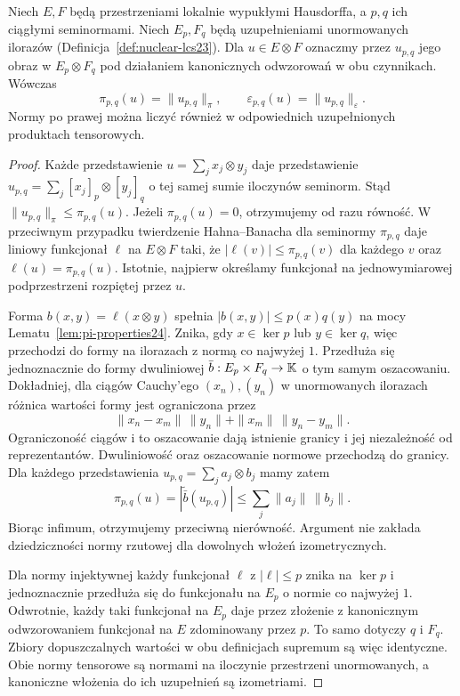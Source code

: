 \begin{lemat}
\label{lem:tensor-seminorm-completions24}
Niech $E,F$ będą przestrzeniami lokalnie wypukłymi
Hausdorffa, a $p,q$ ich ciągłymi seminormami.
Niech $E_p,F_q$ będą uzupełnieniami unormowanych
ilorazów (Definicja~\ref{def:nuclear-lcs23}).
Dla $u\in E\otimes F$ oznaczmy przez $u_{p,q}$
jego obraz w $E_p\otimes F_q$ pod działaniem
kanonicznych odwzorowań w obu czynnikach. Wówczas
\[
 \pi_{p,q}(u)=\|u_{p,q}\|_\pi,\qquad
 \varepsilon_{p,q}(u)=\|u_{p,q}\|_\varepsilon.
\]
Normy po prawej można liczyć również w odpowiednich
uzupełnionych produktach tensorowych.
\end{lemat}
\begin{proof}
Każde przedstawienie $u=\sum_jx_j\otimes y_j$
daje przedstawienie $u_{p,q}=\sum_j[x_j]_p\otimes[y_j]_q$
o tej samej sumie iloczynów seminorm. Stąd
$\|u_{p,q}\|_\pi\le\pi_{p,q}(u)$.
Jeżeli $\pi_{p,q}(u)=0$, otrzymujemy od razu równość.
W przeciwnym przypadku twierdzenie Hahna--Banacha
dla seminormy $\pi_{p,q}$ daje liniowy funkcjonał
$\ell$ na $E\otimes F$ taki, że
$|\ell(v)|\le\pi_{p,q}(v)$ dla każdego $v$
oraz $\ell(u)=\pi_{p,q}(u)$.
Istotnie, najpierw określamy funkcjonał na
jednowymiarowej podprzestrzeni rozpiętej przez $u$.

Forma $b(x,y)=\ell(x\otimes y)$ spełnia
$|b(x,y)|\le p(x)q(y)$ na mocy
Lematu~\ref{lem:pi-properties24}. Znika, gdy
$x\in\ker p$ lub $y\in\ker q$, więc przechodzi
do formy na ilorazach z normą co najwyżej $1$.
Przedłuża się jednoznacznie do formy dwuliniowej
$\bar b:E_p\times F_q\to\mathbb K$ o tym samym oszacowaniu.
Dokładniej, dla ciągów Cauchy'ego $(x_n),(y_n)$
w unormowanych ilorazach różnica wartości formy
jest ograniczona przez
\[
 \|x_n-x_m\|\,\|y_n\|+\|x_m\|\,\|y_n-y_m\|.
\]
Ograniczoność ciągów i to oszacowanie dają istnienie
granicy i jej niezależność od reprezentantów.
Dwuliniowość oraz oszacowanie normowe przechodzą
do granicy. Dla każdego przedstawienia
$u_{p,q}=\sum_j a_j\otimes b_j$ mamy zatem
\[
 \pi_{p,q}(u)=|\widetilde{\bar b}(u_{p,q})|
 \le\sum_j\|a_j\|\,\|b_j\|.
\]
Biorąc infimum, otrzymujemy przeciwną nierówność.
Argument nie zakłada dziedziczności normy rzutowej
dla dowolnych włożeń izometrycznych.

Dla normy injektywnej każdy funkcjonał $\ell$
z $|\ell|\le p$ znika na $\ker p$ i jednoznacznie
przedłuża się do funkcjonału na $E_p$ o normie
co najwyżej $1$. Odwrotnie, każdy taki funkcjonał
na $E_p$ daje przez złożenie z kanonicznym
odwzorowaniem funkcjonał na $E$ zdominowany przez $p$.
To samo dotyczy $q$ i $F_q$. Zbiory dopuszczalnych
wartości w obu definicjach supremum są więc identyczne.
Obie normy tensorowe są normami na iloczynie
przestrzeni unormowanych, a kanoniczne włożenia do
ich uzupełnień są izometriami.
\end{proof}

